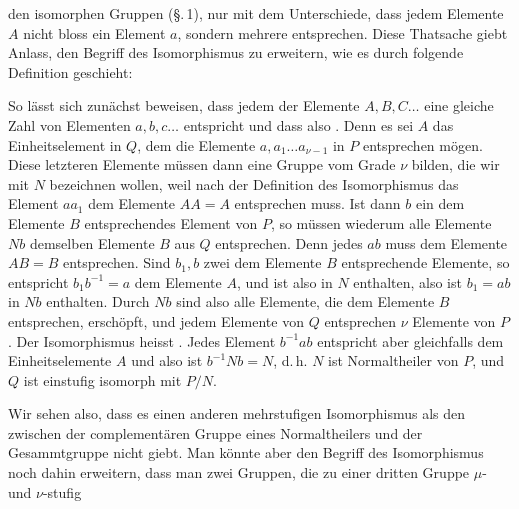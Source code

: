 

den isomorphen Gruppen (\S.\,1), nur mit dem Unterschiede, dass jedem Elemente $A$ nicht bloss ein Element $a$, sondern mehrere entsprechen. Diese Thatsache giebt Anlass, den Begriff des Isomorphismus zu erweitern, wie es durch folgende Definition geschieht:


So lässt sich zunächst beweisen, dass jedem der Elemente $A, B, C \dots$ eine gleiche Zahl von Elementen $a, b, c \dots$ entspricht und dass also . Denn es sei $A$ das Einheitselement in $Q$, dem die Elemente $a, a_1 \dots a_{\nu-1}$ in $P$ entsprechen mögen. Diese letzteren Elemente müssen dann eine Gruppe vom Grade $\nu$ bilden, die wir mit $N$ bezeichnen wollen, weil nach der Definition des Isomorphismus das Element $a a_1$ dem Elemente $AA = A$ entsprechen muss. Ist dann $b$ ein dem Elemente $B$ entsprechendes Element von $P$, so müssen wiederum alle Elemente $Nb$ demselben Elemente $B$ aus $Q$ entsprechen. Denn jedes $ab$ muss dem Elemente $AB = B$ entsprechen. Sind $b_1, b$ zwei dem Elemente $B$ entsprechende Elemente, so entspricht $b_1 b^{-1} = a$ dem Elemente $A$, und ist also in $N$ enthalten, also ist $b_1 = ab$ in $Nb$ enthalten. Durch $Nb$ sind also alle Elemente, die dem Elemente $B$ entsprechen, erschöpft, und jedem Elemente von $Q$ entsprechen $\nu$ Elemente von $P$. Der Isomorphismus heisst . Jedes Element $b^{-1}ab$ entspricht aber gleichfalls dem Einheitselemente $A$ und also ist $b^{-1}Nb = N$, d.\,h. $N$ ist Normaltheiler von $P$, und $Q$ ist einstufig isomorph mit $P/N$.

Wir sehen also, dass es einen anderen mehrstufigen Isomorphismus als den zwischen der complementären Gruppe eines Normaltheilers und der Gesammtgruppe nicht giebt. Man könnte aber den Begriff des Isomorphismus noch dahin erweitern, dass man zwei Gruppen, die zu einer dritten Gruppe $\mu$- und $\nu$-stufig
